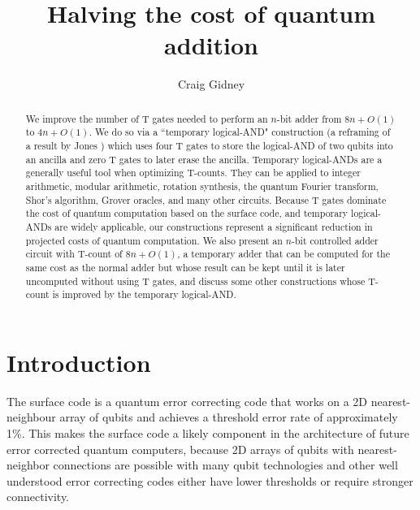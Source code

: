 \documentclass[twocolumn]{revtex4-1}
\begin{document}
\title{Halving the cost of quantum addition}
\author{Craig Gidney}

\begin{abstract}
We improve the number of T gates needed to perform an $n$-bit adder from $8n + O(1)$ \citep{Amy2013, Cuccaro2004, AustinDiscussionsAndEmails2017} to $4n + O(1)$.
We do so via a ``temporary logical-AND" construction (a reframing of a result by Jones \cite{Jones2013}) which uses four T gates to store the logical-AND of two qubits into an ancilla and zero T gates to later erase the ancilla.
Temporary logical-ANDs are a generally useful tool when optimizing T-counts.
They can be applied to integer arithmetic, modular arithmetic, rotation synthesis, the quantum Fourier transform, Shor's algorithm, Grover oracles, and many other circuits.
Because T gates dominate the cost of quantum computation based on the surface code, and temporary logical-ANDs are widely applicable, our constructions represent a significant reduction in projected costs of quantum computation.
We also present an $n$-bit controlled adder circuit with T-count of $8n + O(1)$, a temporary adder that can be computed for the same cost as the normal adder but whose result can be kept until it is later uncomputed without using T gates, and discuss some other constructions whose T-count is improved by the temporary logical-AND.
\end{abstract}

\maketitle

\section*{Introduction}

The surface code \citep{Brav98,Denn02,Raus07,Raus07d,Fowler2012} is a quantum error correcting code that works on a 2D nearest-neighbour array of qubits and achieves a threshold error rate of approximately 1\%.
This makes the surface code a likely component in the architecture of future error corrected quantum computers, because 2D arrays of qubits with nearest-neighbor connections are possible with many qubit technologies \citep{Schl11,Bare13,Gamb17,Leik17,Laht17} and other well understood error correcting codes either have lower thresholds or require stronger connectivity.
\end{document}
